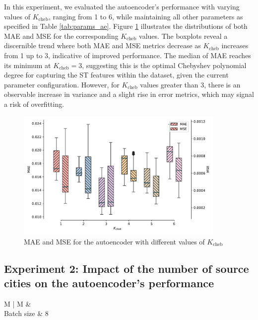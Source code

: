 In this experiment, we evaluated the autoencoder's performance with varying values of \( K_{\text{cheb}} \), ranging from 1 to 6, while maintaining all other parameters as specified in Table \ref{tab:params_ae}. Figure \ref{fig:exp01boxplot} illustrates the distributions of both \gls{MAE} and \gls{MSE} for the corresponding \( K_{\text{cheb}} \) values. The boxplots reveal a discernible trend where both \gls{MAE} and \gls{MSE} metrics decrease as \( K_{\text{cheb}} \) increases from 1 up to 3, indicative of improved performance. The median of \gls{MAE} reaches its minimum at \( K_{\text{cheb}} = 3 \), suggesting this is the optimal Chebyshev polynomial degree for capturing the \gls{ST} features within the dataset, given the current parameter configuration. However, for \( K_{\text{cheb}} \) values greater than 3, there is an observable increase in variance and a slight rise in error metrics, which may signal a risk of overfitting. 

\begin{figure}[!ht]
\noindent\hspace{0.5mm}\includegraphics[width=0.9\textwidth]{./figures/exp01/boxplot.pdf}
\caption{\gls{MAE} and \gls{MSE} for the autoencoder with different values of $K_{\text{cheb}}$}
\label{fig:exp01boxplot}
\end{figure}


\subsection{Experiment 2: Impact of the number of source cities on the autoencoder's performance} \label{ssec:exp2}


\begin{table}[!ht]
\begin{tabularx}{\textwidth}{ M | M }
%
&  \\ \hline
Batch size                                  & 8                            \\ \hline
\end{tabularx}
\caption{Specific parameters for Experiment 2}
\label{tab:exp02}
\end{table}

